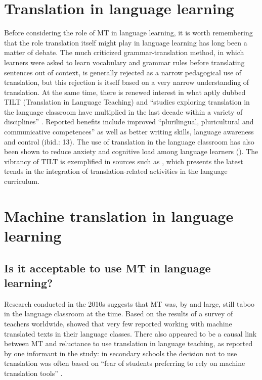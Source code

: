 \documentclass[output=paper,colorlinks,citecolor=brown,
]{langscibook}
\begin{document}
\section{Translation in language learning}\label{sec:carre:2}

Before considering the role of MT in language learning, it is worth remembering that the role translation itself might play in language learning has long been a matter of debate. The much criticized grammar-translation method, in which learners were asked to learn vocabulary and grammar rules before translating sentences out of context, is generally rejected as a narrow pedagogical use of translation, but this rejection is itself based on a very narrow understanding of translation. At the same time, there is renewed interest in what \citet{Cook2010} aptly dubbed TILT (Translation in Language Teaching) and “studies exploring translation in the language classroom have multiplied in the last decade within a variety of disciplines” \citep[12]{PintadoGutiérrez2018}. Reported benefits include improved “plurilingual, pluricultural and communicative competences” as well as better writing skills, language awareness and control (ibid.: 13). The use of translation in the language classroom has also been shown to reduce anxiety and cognitive load among language learners (\citealt{KellyBruen2017}). The vibrancy of TILT is exemplified in sources such as \citet{CarreresGutiérrez2021}, which presents the latest trends in the integration of translation-related activities in the language curriculum.

\section{Machine translation in language learning}\label{sec:carre:3}
\subsection{Is it acceptable to use MT in language learning?}

Research conducted in the 2010s suggests that MT was, by and large, still taboo in the language classroom at the time. Based on the results of a survey of teachers worldwide, \citet{PymMalmkjaer2013} showed that very few reported working with machine translated texts in their language classes. There also appeared to be a causal link between MT and reluctance to use translation in language teaching, as reported by one informant in the study: in secondary schools the decision not to use translation was often based on “fear of students preferring to rely on machine translation tools” \citep[93]{PymMalmkjaer2013}. 
\end{document}
